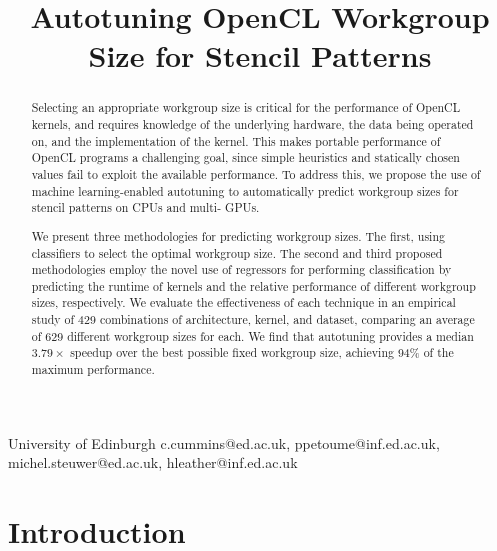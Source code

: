 \documentclass[preprint,nonatbib,10pt,nocopyrightspace]{sigplanconf}
\begin{document}
  \setlength{\pdfpageheight}{\paperheight}
  \setlength{\pdfpagewidth}{\paperwidth}


  \title{Autotuning OpenCL Workgroup Size for Stencil Patterns}

  {University of Edinburgh}
  {c.cummins@ed.ac.uk, ppetoume@inf.ed.ac.uk, michel.steuwer@ed.ac.uk, hleather@inf.ed.ac.uk}

  \maketitle

  \begin{abstract}
    Selecting an appropriate workgroup size is critical for the performance of
    OpenCL kernels, and requires knowledge of the underlying hardware, the data
    being operated on, and the implementation of the kernel. This makes portable
    performance of OpenCL programs a challenging goal, since simple heuristics and
    statically chosen values fail to exploit the available performance. To address
    this, we propose the use of machine learning-enabled autotuning to
    automatically predict workgroup sizes for stencil patterns on CPUs and multi-
    GPUs.

    We present three methodologies for predicting workgroup sizes. The first,
    using classifiers to select the optimal workgroup size. The second and third
    proposed methodologies employ the novel use of regressors for performing
    classification by predicting the runtime of kernels and the relative
    performance of different workgroup sizes, respectively. We evaluate the
    effectiveness of each technique in an empirical study of 429 combinations of
    architecture, kernel, and dataset, comparing an average of 629 different
    workgroup sizes for each. We find that autotuning provides a median
    $3.79\times$ speedup over the best possible fixed workgroup size, achieving
    94\% of the maximum performance.
  \end{abstract}

  \section{Introduction}\label{sec:introduction}
\end{document}
